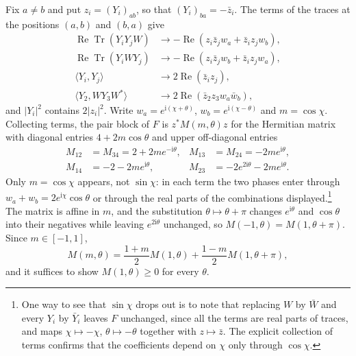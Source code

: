 \documentclass[aps,prd,twocolumn,superscriptaddress,nofootinbib,longbibliography,floatfix,amsmath,amssymb,10pt]{revtex4-2}
\theoremstyle{definition}
\theoremstyle{remark}
\newcommand{\ReTr}{\operatorname{Re}\operatorname{Tr}}
\newcommand{\ip}[2]{\langle #1,#2\rangle}
\begin{document}
Fix $a\ne b$ and put $z_i=(Y_i)_{ab}$, so that $(Y_i)_{ba}=-\bar z_i$. The
terms of the traces at the positions $(a,b)$ and $(b,a)$ give
\begin{align*}
\ReTr(Y_iY_jW)&\to-\operatorname{Re}(z_i\bar z_jw_a+\bar z_iz_jw_b),\\
\ReTr(Y_iWY_j)&\to-\operatorname{Re}(z_i\bar z_jw_b+\bar z_iz_jw_a),\\
\ip{Y_i}{Y_j}&\to2\operatorname{Re}(\bar z_iz_j),\\
\ip{Y_2}{WY_3W^*}&\to2\operatorname{Re}(\bar z_2z_3w_a\bar w_b),
\end{align*}
and $|Y_i|^2$ contains $2|z_i|^2$. Write $w_a=e^{\mathrm i(\chi+\theta)}$,
$w_b=e^{\mathrm i(\chi-\theta)}$ and $m=\cos\chi$. Collecting terms, the pair
block of $F$ is $z^*M(m,\theta)z$ for the Hermitian matrix with diagonal
entries $4+2m\cos\theta$ and upper off-diagonal entries
\begin{align*}
M_{12}&=M_{34}=2+2me^{-\mathrm i\theta},&
M_{13}&=M_{24}=-2me^{\mathrm i\theta},\\
M_{14}&=-2-2me^{\mathrm i\theta},&
M_{23}&=-2e^{2\mathrm i\theta}-2me^{\mathrm i\theta}.
\end{align*}
Only $m=\cos\chi$ appears, not $\sin\chi$: in each term the two phases enter
through $w_a+w_b=2e^{\mathrm i\chi}\cos\theta$ or through the real parts of
the combinations displayed.\footnote{One way to see that $\sin\chi$ drops
out is to note that replacing $W$ by $\bar W$ and every $Y_i$ by $\bar Y_i$
leaves $F$ unchanged, since all the terms are real parts of traces, and maps
$\chi\mapsto-\chi$, $\theta\mapsto-\theta$ together with $z\mapsto\bar z$.
The explicit collection of terms confirms that the coefficients depend on
$\chi$ only through $\cos\chi$.} The matrix is affine in $m$, and the
substitution $\theta\mapsto\theta+\pi$ changes $e^{\mathrm i\theta}$ and
$\cos\theta$ into their negatives while leaving $e^{2\mathrm i\theta}$
unchanged, so $M(-1,\theta)=M(1,\theta+\pi)$. Since $m\in[-1,1]$,
\[
M(m,\theta)=\frac{1+m}2M(1,\theta)+\frac{1-m}2M(1,\theta+\pi),
\]
and it suffices to show $M(1,\theta)\ge0$ for every $\theta$.
\end{document}
